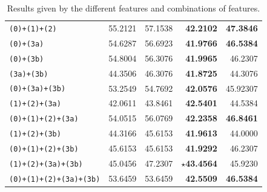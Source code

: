 \begin{table}[!htbp]
\begin{tabular}{l|rr|rr}
        \texttt{(0)+(1)+(2)}                & 55.2121                    & 57.1538                   & \textbf{42.2102}        & \textbf{47.3846}        \\
        \texttt{(0)+(3a)}                   & 54.6287                    & 56.6923                   & \textbf{41.9766}        & \textbf{46.5384}        \\
        \texttt{(0)+(3b)}                   & 54.8004                    & 56.3076                   & \textbf{41.9965}        & 46.2307                 \\
        \texttt{(3a)+(3b)}                  & 44.3506                    & 46.3076                   & \textbf{41.8725}        & 44.3076                 \\
        \texttt{(0)+(3a)+(3b)}              & 53.2549                    & 54.7692                   & \textbf{42.0576}        & 45.92307                \\
        \texttt{(1)+(2)+(3a)}               & 42.0611                    & 43.8461                   & \textbf{42.5401}        & 44.5384                 \\
        \texttt{(0)+(1)+(2)+(3a)}           & 54.0515                    & 56.0769                   & \textbf{42.2358}        & \textbf{46.8461}        \\
        \texttt{(1)+(2)+(3b)}               & 44.3166                    & 45.6153                   & \textbf{41.9613}        & 44.0000                 \\
        \texttt{(0)+(1)+(2)+(3b)}           & 45.6153                    & 45.6153                   & \textbf{41.9292}        & 46.2307                 \\
        \texttt{(1)+(2)+(3a)+(3b)}          & 45.0456                    & 47.2307                   & \textbf{$\star$43.4564} & 45.9230                 \\
        \texttt{(0)+(1)+(2)+(3a)+(3b)}      & 53.6459                    & 53.6459                   & \textbf{42.5509}        & \textbf{46.5384}        \\
    \end{tabular}
    \caption{Results given by the different features and combinations of features.}
    \label{tab:results_prop_features_classifier}
\end{table}

